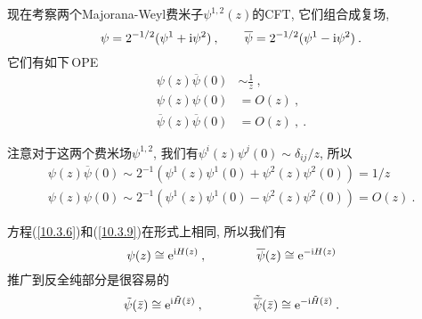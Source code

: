 现在考察两个Majorana-Weyl费米子$ \psi^{1,2}(z) $的CFT, 它们组合成复场,
\begin{equation}
    \psi=2^{-1/2}(\psi^{1}+\mathrm{i}\psi^{2})\:, \qquad \overline{\psi}=2^{-1/2}(\psi^{1}-\mathrm{i}\psi^{2})\:.\label{10.3.8}
\end{equation}
它们有如下\,OPE
\begin{subequations}
\begin{align}
    \psi(z)\overline{\psi}(0)&\sim\frac{1}{z} \:, \label{10.3.9a} \\
    \psi(z)\psi(0) &= O(z) \:, \label{10.3.9b} \\
    \overline{\psi}(z)\overline{\psi}(0) &= O(z) \:, \label{10.3.9c}\:.
\end{align} \label{10.3.9}
\end{subequations}
\begin{tcolorbox}
注意对于这两个费米场$ \psi^{1,2}$, 我们有$ \psi^{i}(z)\psi^{j}(0)\sim \delta_{ij}/z$, 所以
\begin{gather*}
    \psi(z)\overline{\psi}(0) \sim 2^{-1} (\psi^{1}(z)\psi^{1}(0)+\psi^{2}(z)\psi^{2}(0)) = 1/z \\
    \psi(z)\psi(0) \sim 2^{-1} (\psi^{1}(z)\psi^{1}(0)-\psi^{2}(z)\psi^{2}(0)) = O(z) \:.
\end{gather*}
\end{tcolorbox}
方程(\ref{10.3.6})和(\ref{10.3.9})在形式上相同, 所以我们有
\begin{equation}
    \psi(z)\cong \mathrm{e}^{\mathrm{i} H(z)} \:, \qquad \qquad \overline{\psi}(z)\cong \mathrm{e}^{-\mathrm{i} H(z)} \label{10.3.10}
\end{equation}
推广到反全纯部分是很容易的
\begin{equation}
    \tilde{\psi}(\bar{z}) \cong \mathrm{e}^{\mathrm{i}\tilde{H}(\bar{z})} \:, \qquad \qquad
    \tilde{\overline{\psi}}(\bar{z})\cong \mathrm{e}^{-\mathrm{i}\tilde{H}(\bar{z})} \:. \label{10.3.11}
\end{equation}

